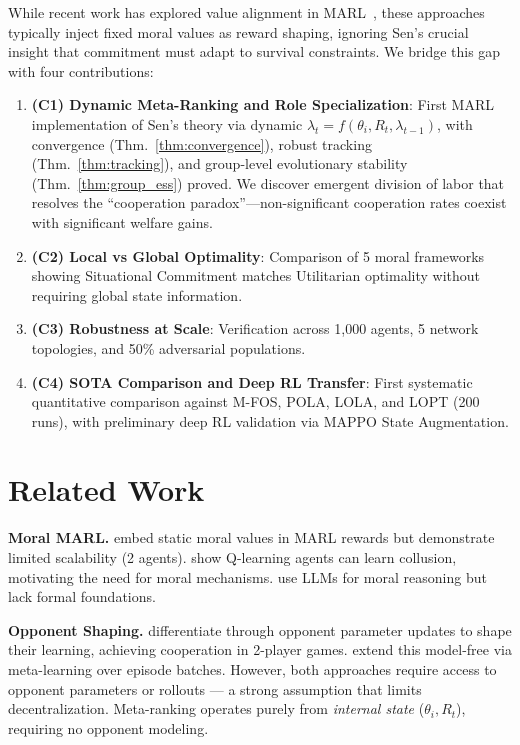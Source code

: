 \documentclass{article}
\begin{document}
While recent work has explored value alignment in MARL~\citep{rodriguez2021multi,christoffersen2023get}, these approaches typically inject fixed moral values as reward shaping, ignoring Sen's crucial insight that commitment must adapt to survival constraints.
We bridge this gap with four contributions:

\begin{enumerate}
    \item \textbf{(C1) Dynamic Meta-Ranking and Role Specialization}: First MARL implementation of Sen's theory via dynamic $\lambda_t{=}f(\theta_i, R_t, \lambda_{t-1})$, with convergence (Thm.~\ref{thm:convergence}), robust tracking (Thm.~\ref{thm:tracking}), and group-level evolutionary stability (Thm.~\ref{thm:group_ess}) proved. We discover emergent division of labor that resolves the ``cooperation paradox''---non-significant cooperation rates coexist with significant welfare gains.
    \item \textbf{(C2) Local vs Global Optimality}: Comparison of 5 moral frameworks showing Situational Commitment matches Utilitarian optimality without requiring global state information.
    \item \textbf{(C3) Robustness at Scale}: Verification across 1,000 agents, 5 network topologies, and 50\% adversarial populations.
    \item \textbf{(C4) SOTA Comparison and Deep RL Transfer}: First systematic quantitative comparison against M-FOS, POLA, LOLA, and LOPT (200 runs), with preliminary deep RL validation via MAPPO State Augmentation.
\end{enumerate}

\section{Related Work}

\textbf{Moral MARL.}
\citet{rodriguez2021multi} embed static moral values in MARL rewards but demonstrate limited scalability (2 agents).
\citet{calvano2020artificial} show Q-learning agents can learn collusion, motivating the need for moral mechanisms.
\citet{christoffersen2023get} use LLMs for moral reasoning but lack formal foundations.

\textbf{Opponent Shaping.}
\citet{foerster2018lola} differentiate through opponent parameter updates to shape their learning, achieving cooperation in 2-player games.
\citet{lu2022mfos} extend this model-free via meta-learning over episode batches.
However, both approaches require access to opponent parameters or rollouts --- a strong assumption that limits decentralization.
Meta-ranking operates purely from \textit{internal state} ($\theta_i, R_t$), requiring no opponent modeling.
\end{document}
